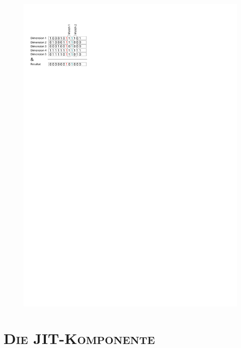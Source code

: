 \documentclass[xcolor=x11names,compress]{beamer}
\renewcommand{\(}{\begin{columns}}
\renewcommand{\)}{\end{columns}}
\newcommand{\<}[1]{\begin{column}{#1}}
\renewcommand{\>}{\end{column}}
\begin{document}
\begin{frame}
  \begin{figure}
  \centering
  \includegraphics[height=0.7\textheight]{figures/matching}
  \end{figure}
\end{frame}

\section{\scshape Die JIT-Komponente}
\end{document}
